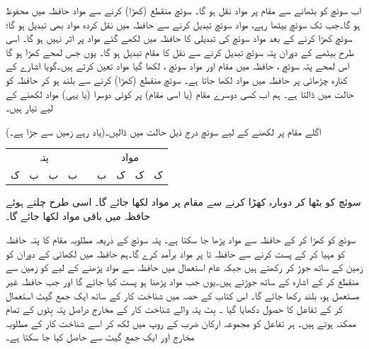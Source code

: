 اب  سوئچ کو بٹھانے سے   مقام  پر مواد  نقل ہو گا۔ سوئچ   منقطع (کھڑا) کرنے سے مواد حافظہ میں  محفوظ ہو گا۔جب تک  سوئچ  بیٹھا رہے، مواد  سوئچ تبدیل کرنے سے   حافظہ میں  نقل کردہ مواد  بھی تبدیل ہو گا؛ سوئچ کھڑا کرنے  کے بعد مواد سوئچ کی تبدیلی کا حافظہ میں لکھے گئے مواد پر  اثر نہیں ہو گا۔ اسی طرح بیٹھے  کے دوران پتہ سوئچ تبدیل کرنے سے   نقل کا مقام تبدیل ہو گا۔ یوں جس لمحے  کھڑا ہو گا اس لمحے پتہ سوئچ   ، حافظہ میں مقام  اور مواد سوئچ  ، لکھا گیا مواد تعین کرتے ہیں۔گویا   اشارے کے کنارہ چڑھائی پر  حافظہ میں مواد لکھا جاتا ہے۔ سوئچ  منقطع (کھڑا) کرنے   سے  بلند ہو کر حافظہ  کو     حالت میں ڈالتا ہے۔ ہم اب  کسی دوسرے مقام (یا اسی مقام) پر کوئی دوسرا (یا یہی) مواد لکھنے کے لیے تیار ہیں۔

اگلے مقام  پر   لکھنے کے لیے سوئچ درج ذیل حالت میں ڈالیں۔(یاد رہے  زمین سے جڑا ہے۔)
\begin{center}
\begin{tabular}{ccccccccc}
\multicolumn{4}{c}{پتہ}&\phantom{ک }&\multicolumn{4}{c}{مواد}\\[0.5ex]
ک&ب&ب&ب&&ب&ک&ک&ک
\end{tabular}
\end{center}
سوئچ  کو بٹھا کر  دوبارہ کھڑا کرنے سے مقام  پر مواد  لکھا جائے گا۔ اسی طرح  چلتے ہوئے حافظہ میں باقی مواد   لکھا جائے گا۔

سوئچ  کو کھڑا کر کے حافظہ سے مواد پڑھا جا سکتا ہے۔  پتہ سوئچ  کے ذریعہ  مطلوبہ مقام کا پتہ حافظہ کو مہیا کر کے      پست کرنے سے حافظہ    تا   پر  مواد  برآمد کرے گا۔ہم   حافظہ میں  لکھائی کے دوران  کو زمین کے ساتھ جوڑ کر رکھتے ہیں   جبکہ  عام استعمال میں  حافظہ سے مواد پڑھنے کے لیے    کو زمین سے منقطع کر کے اشارہ    کے ساتھ جوڑتے ہیں۔یوں  جب مواد پڑھنا ہو   پست کیا جائے گا اور جب حافظہ غیر مستعمل ہو،     بلند رکھا جائے گا۔
اس کتاب کے حصہ  میں شناخت کار کے ساتھ ایک جمع گیٹ استعمال کر کے تفاعل کا حصول دکھایا گیا ۔  بِٹ پتہ والے شناخت کار کے  مخارج دراصل پتہ بِٹوں کے تمام ممکنہ  ہوتے ہیں۔ ہر تفاعل کو مجموعہ ارکان ضرب کے روپ میں لکھ کر اسے شناخت کار کے مطلوبہ مخارج اور ایک جمع گیٹ سے حاصل کیا جا سکتا ہے۔ 

